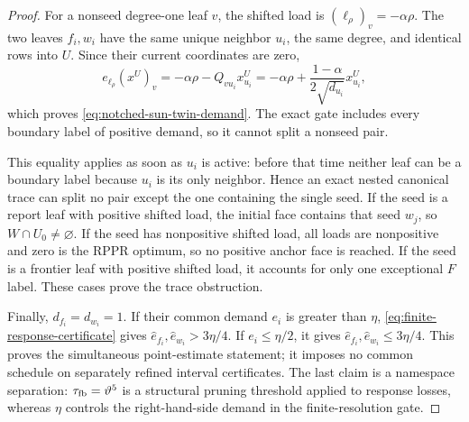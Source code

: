 \begin{proof}
For a nonseed degree-one leaf $v$, the shifted load is
$(\ell_\rho)_v=-\alpha\rho$.  The two leaves $f_i,w_i$ have the same unique
neighbor $u_i$, the same degree, and identical rows into $U$.  Since their
current coordinates are zero,
\begin{equation*}
 e_{\ell_\rho}(x^U)_v
 =-\alpha\rho-Q_{vu_i}x^U_{u_i}
 =-\alpha\rho
   +\frac{1-\alpha}{2\sqrt{d_{u_i}}}x^U_{u_i},
\end{equation*}
which proves \cref{eq:notched-sun-twin-demand}.  The exact gate includes
every boundary label of positive demand, so it cannot split a nonseed pair.

This equality applies as soon as $u_i$ is active: before that time neither
leaf can be a boundary label because $u_i$ is its only neighbor.  Hence an
exact nested canonical trace can split no pair except the one containing the
single seed.  If the seed is a report leaf with positive shifted load, the
initial face contains that seed $w_j$, so $W\cap U_0\neq\varnothing$.  If the
seed has nonpositive shifted load, all loads are nonpositive and zero is the
RPPR optimum, so no positive anchor face is
reached.  If the seed is a frontier leaf with positive shifted load, it
accounts for only one exceptional $F$ label.  These cases prove the trace
obstruction.

Finally, $d_{f_i}=d_{w_i}=1$.  If their common demand $e_i$ is greater than
$\eta$, \cref{eq:finite-response-certificate} gives
$\widehat e_{f_i},\widehat e_{w_i}>3\eta/4$.  If
$e_i\leq\eta/2$, it gives
$\widehat e_{f_i},\widehat e_{w_i}\leq3\eta/4$.
This proves the simultaneous point-estimate statement; it imposes no common
schedule on separately refined interval certificates.  The last claim is a
namespace separation: $\tau_{\rm fb}=\vartheta^5$ is a structural pruning
threshold applied to response losses, whereas $\eta$ controls the
right-hand-side demand in the finite-resolution gate.
\end{proof}

